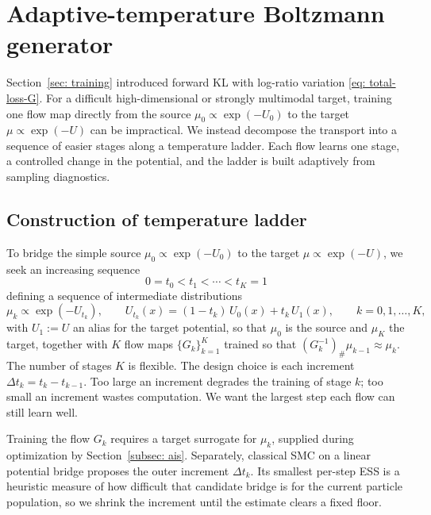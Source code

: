 \documentclass{article}
\begin{document}
\section{Adaptive-temperature Boltzmann generator}
\label{sec: boltzmann}

Section~\ref{sec: training} introduced forward KL with log-ratio variation \eqref{eq: total-loss-G}. For a difficult high-dimensional or strongly multimodal target, training one flow map directly from the source $\mu_0 \propto \exp(-U_0)$ to the target $\mu \propto \exp(-U)$ can be impractical. We instead decompose the transport into a sequence of easier stages along a temperature ladder. Each flow learns one stage, a controlled change in the potential, and the ladder is built adaptively from sampling diagnostics.

\subsection{Construction of temperature ladder}

To bridge the simple source $\mu_0 \propto \exp(-U_0)$ to the target $\mu \propto \exp(-U)$, we seek an increasing sequence
\begin{equation*}
    0 = t_0 < t_1 < \cdots < t_K = 1
\end{equation*}
defining a sequence of intermediate distributions
\begin{equation*}
    \mu_k\propto \exp(-U_{t_k}), \qquad
    U_{t_k}(x) = (1-t_k)\, U_0(x) + t_k\, U_1(x), \qquad
    k = 0,1,\dots,K,
\end{equation*}
with $U_1 := U$ an alias for the target potential, so that $\mu_0$ is the source and $\mu_K$ the target, together with $K$ flow maps $\{G_k\}_{k=1}^{K}$ trained so that $(G_k^{-1})_{\#} \mu_{k-1} \approx \mu_{k}$. The number of stages $K$ is flexible. The design choice is each increment $\Delta t_k = t_k - t_{k-1}$. Too large an increment degrades the training of stage $k$; too small an increment wastes computation. We want the largest step each flow can still learn well.

Training the flow $G_k$ requires a target surrogate for $\mu_k$, supplied during optimization by Section~\ref{subsec: ais}. Separately, classical SMC on a linear potential bridge proposes the outer increment $\Delta t_k$. Its smallest per-step ESS is a heuristic measure of how difficult that candidate bridge is for the current particle population, so we shrink the increment until the estimate clears a fixed floor.
\end{document}
